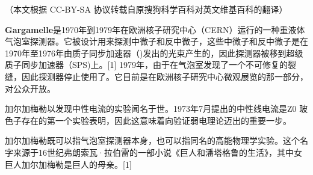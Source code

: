 
（本文根据 CC-BY-SA 协议转载自原搜狗科学百科对英文维基百科的翻译）

\textbf{Gargamelle}是1970年到1979年在欧洲核子研究中心（CERN）运行的一种重液体气泡室探测器。它被设计用来探测中微子和反中微子，这些中微子和反中微子是在1970年至1976年由质子同步加速器（)发出的光束产生的，因此探测器被移到超级质子同步加速器（SPS)上。[1] 1979年，由于在气泡室发现了一个不可修复的裂缝，因此探测器停止使用了。它目前是在欧洲核子研究中心微观展览的那一部分，对公众开放。

加尔加梅勒以发现中性电流的实验闻名于世。1973年7月提出的中性线电流是Z0 玻色子存在的第一个实验表明，因此这意味着向验证弱电理论迈出的重要一步。

加尔加梅勒既可以指气泡室探测器本身，也可以指同名的高能物理学实验。这个名字来源于16世纪弗朗索瓦·拉伯雷的一部小说《巨人和潘塔格鲁的生活》，其中女巨人加尔加梅勒是巨人的母亲。[1]